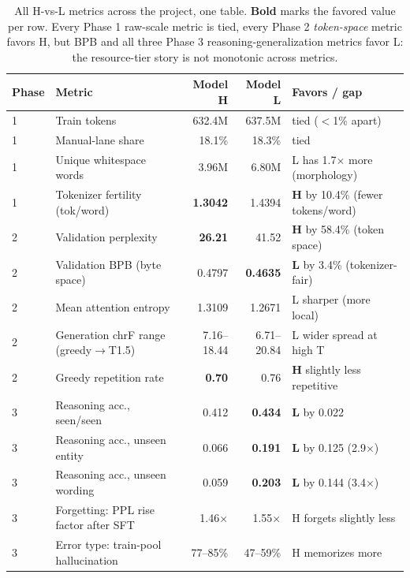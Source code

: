 \documentclass[11pt]{article}
\begin{document}
\begin{table}[H]
\centering\footnotesize
\begin{tabular}{lp{2.6cm}rrl}
\toprule
\textbf{Phase} & \textbf{Metric} & \textbf{Model H} & \textbf{Model L} & \textbf{Favors / gap} \\
\midrule
1 & Train tokens & 632.4M & 637.5M & tied ($<$1\% apart) \\
1 & Manual-lane share & 18.1\% & 18.3\% & tied \\
1 & Unique whitespace words & 3.96M & 6.80M & L has 1.7$\times$ more (morphology) \\
1 & Tokenizer fertility (tok/word) & \textbf{1.3042} & 1.4394 & \textbf{H} by 10.4\% (fewer tokens/word) \\
2 & Validation perplexity & \textbf{26.21} & 41.52 & \textbf{H} by 58.4\% (token space) \\
2 & Validation BPB (byte space) & 0.4797 & \textbf{0.4635} & \textbf{L} by 3.4\% (tokenizer-fair) \\
2 & Mean attention entropy & 1.3109 & 1.2671 & L sharper (more local) \\
2 & Generation chrF range (greedy$\to$T1.5) & 7.16--18.44 & 6.71--20.84 & L wider spread at high T \\
2 & Greedy repetition rate & \textbf{0.70} & 0.76 & \textbf{H} slightly less repetitive \\
3 & Reasoning acc., seen/seen & 0.412 & \textbf{0.434} & \textbf{L} by 0.022 \\
3 & Reasoning acc., unseen entity & 0.066 & \textbf{0.191} & \textbf{L} by 0.125 (2.9$\times$) \\
3 & Reasoning acc., unseen wording & 0.059 & \textbf{0.203} & \textbf{L} by 0.144 (3.4$\times$) \\
3 & Forgetting: PPL rise factor after SFT & 1.46$\times$ & 1.55$\times$ & H forgets slightly less \\
3 & Error type: train-pool hallucination & 77--85\% & 47--59\% & H memorizes more \\
\bottomrule
\end{tabular}
\caption{All H-vs-L metrics across the project, one table. \textbf{Bold} marks the favored value per row. Every Phase 1 raw-scale metric is tied, every Phase 2 \emph{token-space} metric favors H, but BPB and all three Phase 3 reasoning-generalization metrics favor L: the resource-tier story is not monotonic across metrics.}
\label{tab:crossphase}
\end{table}

\end{document}
